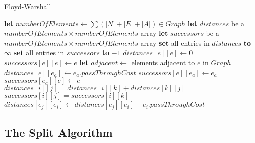 \begin{algorithm}[thbp]
\caption{Floyd-Warshall}\label{floyd-warshall-pseudocode}
\begin{algorithmic}[1]

	\State \textbf{let} $numberOfElements \leftarrow \sum (|N|+|E|+|A|) \in Graph$
	\State \textbf{let} $distances$ be a $numberOfElements \times numberOfElements$ array
	\State \textbf{let} $successors$ be a $numberOfElements \times numberOfElements$ array
	\State \textbf{set} all entries in $distances$ \textbf{to} $\infty$
	\State \textbf{set} all entries in $successors$ \textbf{to} $-1$
	\Statex
		\State $distances[e][e] \leftarrow 0$
		\State $successors[e][e] \leftarrow e$
	\EndFor
	\Statex
		\State \textbf{let} $adjacent \leftarrow $ elements adjacent to $e$ in $Graph$
			\State $distances[e][e_a] \leftarrow e_a.passThroughCost$
			\State $successors[e][e_a] \leftarrow e_a$
			\State $successors[e_a][e] \leftarrow e$
		\EndFor
	\EndFor
	\Statex
					\State $distances[i][j] = distances[i][k] + distances[k][j]$
					\State $successors[i][j] = successors[i][k]$
				\EndIf
			\EndFor
		\EndFor
	\EndFor
	\Statex
			\State $distances[e_j][e_i] \leftarrow distances[e_j][e_i] - e_i.passThroughCost$
		\EndIf
	\EndFor
\EndProcedure

\end{algorithmic}
\end{algorithm}






\subsection{The Split Algorithm} %
\label{sub:the_split_algorithm}



\cleardoublepage